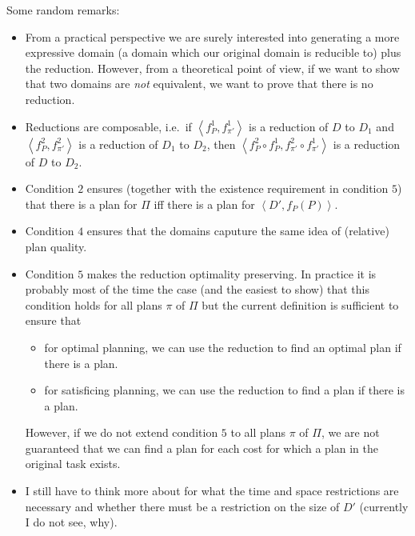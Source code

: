 \noindent Some random remarks:
\begin{itemize}
    \item From a practical perspective we are surely interested into generating
        a more expressive domain (a domain which our original domain is 
        reducible to) plus the reduction. However, from a theoretical point of
        view, if we want to show that two domains are \emph{not} equivalent, we
        want to prove that there is no reduction.
    \item Reductions are composable, i.e.\ if $\left<f_P^1, f_{\pi'}^1\right>$
          is a reduction of $D$ to $D_1$ and $\left<f_P^2, f_{\pi'}^2\right>$
          is a reduction of $D_1$ to $D_2$, then $\left<f_P^2\circ f_P^1, 
          f_{\pi'}^2\circ f_{\pi'}^1\right>$ is a reduction of $D$ to $D_2$.
    \item Condition $2$ ensures (together with the existence requirement in
          condition $5$) that there is a plan for $\Pi$ iff there is a
          plan for $\left<D', f_P(P)\right>$.
    \item Condition $4$ ensures that the domains caputure the same idea
          of (relative) plan quality.
    \item Condition $5$ makes the reduction optimality preserving. In practice
          it is probably most of the time the case (and the easiest to show) that
          this condition holds for all plans $\pi$ of $\Pi$ but the current
          definition is sufficient to ensure that 
          \begin{itemize}
            \item for optimal planning, we can use the reduction to find an
                optimal plan if there is a plan.
            \item for satisficing planning, we can use the reduction to
                find a plan if there is a plan.
          \end{itemize}
          However, if we do not extend condition $5$ to all plans $\pi$ of
          $\Pi$, we are not guaranteed that we can find a plan for each
          cost for which a plan in the original task exists.
    \item I still have to think more about for what the time and space
          restrictions are necessary and whether there must be a 
          restriction on the size of $D'$ (currently I do not see, why).
\end{itemize}

